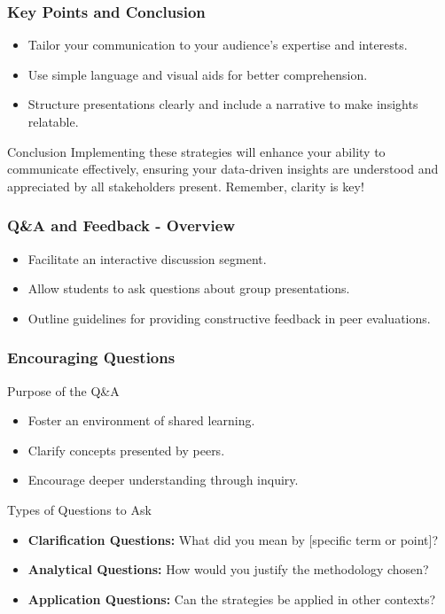 \documentclass{beamer}
\begin{document}
\begin{frame}[fragile]
    \frametitle{Key Points and Conclusion}
    \begin{itemize}
        \item Tailor your communication to your audience's expertise and interests.
        \item Use simple language and visual aids for better comprehension.
        \item Structure presentations clearly and include a narrative to make insights relatable.
    \end{itemize}
    
    \begin{block}{Conclusion}
        Implementing these strategies will enhance your ability to communicate effectively, ensuring your data-driven insights are understood and appreciated by all stakeholders present. Remember, clarity is key!
    \end{block}
\end{frame}

\begin{frame}[fragile]
    \frametitle{Q\&A and Feedback - Overview}
    \begin{itemize}
        \item Facilitate an interactive discussion segment.
        \item Allow students to ask questions about group presentations.
        \item Outline guidelines for providing constructive feedback in peer evaluations.
    \end{itemize}
\end{frame}

\begin{frame}[fragile]
    \frametitle{Encouraging Questions}
    \begin{block}{Purpose of the Q\&A}
        \begin{itemize}
            \item Foster an environment of shared learning.
            \item Clarify concepts presented by peers.
            \item Encourage deeper understanding through inquiry.
        \end{itemize}
    \end{block}
    
    \begin{block}{Types of Questions to Ask}
        \begin{itemize}
            \item \textbf{Clarification Questions:} What did you mean by [specific term or point]?
            \item \textbf{Analytical Questions:} How would you justify the methodology chosen?
            \item \textbf{Application Questions:} Can the strategies be applied in other contexts?
        \end{itemize}
    \end{block}
\end{frame}
\end{document}
